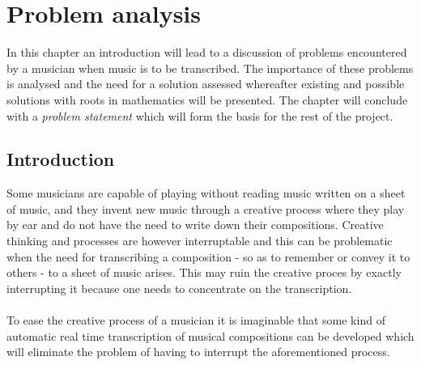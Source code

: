 \chapter{Problem analysis} \label{ch1}
In this chapter an introduction will lead to a discussion of problems encountered by a musician when music is to be transcribed. The importance of these problems is analysed and the need for a solution assessed whereafter existing and possible solutions with roots in mathematics will be presented. The chapter will conclude with a \textit{problem statement} which will form the basis for the rest of the project.
\section{Introduction}
Some musicians are capable of playing without reading music written on a sheet of music, and they invent new music through a creative process where they play by ear and do not have the need to write down their compositions. Creative thinking and processes are however interruptable and this can be problematic when the need for transcribing a composition - so as to remember or convey it to others - to a sheet of music arises. This may ruin the creative proces by exactly interrupting it because one needs to concentrate on the transcription.\\\\
To ease the creative process of a musician it is imaginable that some kind of automatic real time transcription of musical compositions can be developed which will eliminate the problem of having to interrupt the aforementioned process.
